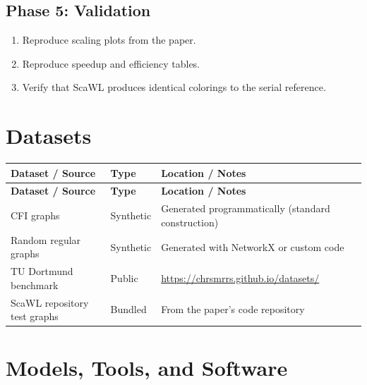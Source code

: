 \documentclass[11pt,a4paper]{article}
\begin{document}
\subsection{Phase 5: Validation}
\begin{enumerate}[label=\textbf{5.\arabic*}]
  \item Reproduce scaling plots from the paper.
  \item Reproduce speedup and efficiency tables.
  \item Verify that ScaWL produces identical colorings to the serial reference.
\end{enumerate}

\section{Datasets}

\begin{longtable}{p{4.5cm} p{3.5cm} p{6cm}}
\toprule
\textbf{Dataset / Source} & \textbf{Type} & \textbf{Location / Notes} \\
\midrule
\endfirsthead
\toprule
\textbf{Dataset / Source} & \textbf{Type} & \textbf{Location / Notes} \\
\midrule
\endhead
CFI graphs & Synthetic & Generated programmatically (standard construction) \\
\midrule
Random regular graphs & Synthetic & Generated with NetworkX or custom code \\
\midrule
TU Dortmund benchmark & Public & \url{https://chrsmrrs.github.io/datasets/} \\
\midrule
ScaWL repository test graphs & Bundled & From the paper's code repository \\
\bottomrule
\end{longtable}

\section{Models, Tools, and Software}
\end{document}
